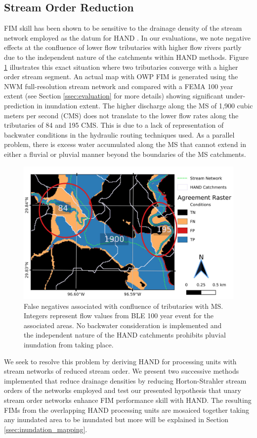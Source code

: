 \subsection{Stream Order Reduction}
\label{ssec:stream_order_reduction}
%
FIM skill has been shown to be sensitive to the drainage density of the stream network employed as the datum for HAND \cite{zhang2018comparative,mcgehee2016modified,li2020evaluation,nobre2016hand}.
In our evaluations, we note negative effects at the confluence of lower flow tributaries with higher flow rivers partly due to the independent nature of the catchments within HAND methods.
Figure \ref{fig:catchment_boundaries_issue} illustrates this exact situation where two tributaries converge with a higher order stream segment. 
An actual map with OWP FIM is generated using the NWM full-resolution stream network and compared with a FEMA 100 year extent (see Section \ref{ssec:evaluation} for more details) showing significant under-prediction in inundation extent.
The higher discharge along the MS of 1,900 cubic meters per second (CMS) does not translate to the lower flow rates along the tributaries of 84 and 195 CMS. 
This is due to a lack of representation of backwater conditions in the hydraulic routing techniques used.
As a parallel problem, there is excess water accumulated along the MS that cannot extend in either a fluvial or pluvial manner beyond the boundaries of the MS catchments.
%
\begin{figure}[h!]
\centering
\includegraphics[scale=1.0]{figures/catchment_boundaries_issue.jpg}
\caption{False negatives associated with confluence of tributaries with MS. Integers represent flow values from BLE 100 year event for the associated areas. 
No backwater consideration is implemented and the independent nature of the HAND catchments prohibits pluvial inundation from taking place.}
\label{fig:catchment_boundaries_issue}
\end{figure}
%
We seek to resolve this problem by deriving HAND for processing units with stream networks of reduced stream order. 
We present two successive methods implemented that reduce drainage densities by reducing Horton-Strahler stream orders of the networks employed and test our presented hypothesis that unary stream order networks enhance FIM performance skill with HAND.
The resulting FIMs from the overlapping HAND processing units are mosaiced together taking any inundated area to be inundated but more will be explained in Section \ref{ssec:inundation_mapping}.
%
